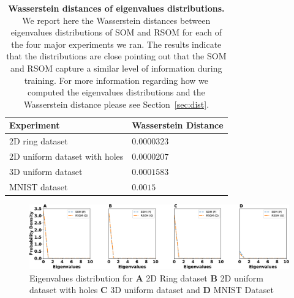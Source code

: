 \begin{table}[!ht]
  \begin{center}
    \begin{tabular}{ll}
        \textbf{Experiment} & \textbf{Wasserstein Distance} \\
        \hline
        $2$D ring dataset               & $0.0000323$\\
        $2$D uniform dataset with holes & $0.0000207$  \\
        $3$D uniform dataset            & $0.0001583$ \\
        MNIST dataset                   & $0.0015$ \\
    \end{tabular}
      \caption{\textbf{Wasserstein distances of eigenvalues distributions.} We report here the Wasserstein 
      distances between eigenvalues distributions of SOM and RSOM for each of the four major experiments we
      ran. The results indicate that the distributions are close pointing out that the SOM and RSOM capture
      a similar level of information during training. For more information regarding how we computed the 
      eigenvalues distributions and the Wasserstein distance please see Section~\ref{sec:dist}.}
      \label{table:distances}
  \end{center}
\end{table}

\begin{figure}
  \includegraphics[width=\columnwidth]{eig-distributions-new.pdf}
  \caption{Eigenvalues distribution for \textbf{A} 2D Ring dataset \textbf{B} 2D uniform dataset with holes \textbf{C} 3D uniform dataset and \textbf{D} MNIST Dataset
  }%
  \label{fig:eigenvalues}
 \end{figure}
